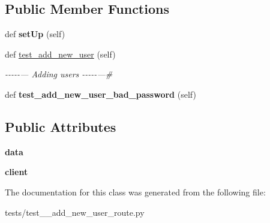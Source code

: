 \subsection*{Public Member Functions}
\begin{DoxyCompactItemize}
\item 
\mbox{\label{classtests_1_1test__1__add__new__user__route_1_1_test_user_routes_aea4e4849bb5076ccc22c20be643e6a0b}} 
def {\bfseries set\+Up} (self)
\item 
\mbox{\label{classtests_1_1test__1__add__new__user__route_1_1_test_user_routes_a7f6feef69e3a930caf8313357219fae1}} 
def \hyperlink{classtests_1_1test__1__add__new__user__route_1_1_test_user_routes_a7f6feef69e3a930caf8313357219fae1}{test\+\_\+add\+\_\+new\+\_\+user} (self)
\begin{DoxyCompactList}\small\item\em -\/-\/-\/-\/-\/--- Adding users -\/-\/-\/-\/-\/---\# \end{DoxyCompactList}\item 
\mbox{\label{classtests_1_1test__1__add__new__user__route_1_1_test_user_routes_a84b1599ae9db3248ded845969d83c7fa}} 
def {\bfseries test\+\_\+add\+\_\+new\+\_\+user\+\_\+bad\+\_\+password} (self)
\end{DoxyCompactItemize}
\subsection*{Public Attributes}
\begin{DoxyCompactItemize}
\item 
\mbox{\label{classtests_1_1test__1__add__new__user__route_1_1_test_user_routes_ae252557390d4acfdc978bff4b26ffeaa}} 
{\bfseries data}
\item 
\mbox{\label{classtests_1_1test__1__add__new__user__route_1_1_test_user_routes_a3a446edfe4af7dbc375d2ae69ae8bcac}} 
{\bfseries client}
\end{DoxyCompactItemize}


The documentation for this class was generated from the following file\+:\begin{DoxyCompactItemize}
\item 
tests/test\+\_\+\_\+add\+\_\+new\+\_\+user\+\_\+route.\+py\end{DoxyCompactItemize}
